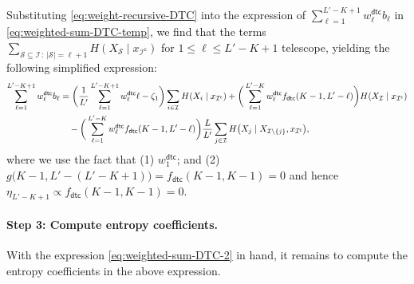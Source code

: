 \documentclass[english]{article}
\newcommand{\cS}{\mathcal{S}}
\newcommand{\cI}{\mathcal{I}}
\newcommand{\dtc}{\mathsf{dtc}}
\begin{document}
Substituting \eqref{eq:weight-recursive-DTC} into the expression of $ \sum_{\ell = 1}^{L'-K+1} w^\dtc_{\ell} b_{\ell} $ in \eqref{eq:weighted-sum-DTC-temp}, we find that the terms $ \sum_{\cS \subseteq \cI \,:\, |\cS|=\ell+1} H(X_{\cS} \mid x_{\cI^\mathsf{c}}) $ for $1\leq \ell \leq L'-K+ 1$ telescope, yielding the following simplified expression:
\begin{align}
\sum_{\ell = 1}^{L'-K+1} w^\dtc_{\ell} b_{\ell}
& = \bigg(\frac{1}{L'} \sum_{\ell = 1}^{L'-K+1}  w^\dtc_{\ell} \ell -  \zeta_{1}\bigg) \sum_{i \in \cI} H(X_i \mid x_{\cI^\mathsf{c}}) + \bigg(\sum_{\ell = 1}^{L'-K} w^\dtc_{\ell} f_\dtc(K-1, L'-\ell) \bigg) H(X_{\cI} \mid x_{\cI^\mathsf{c}}) \notag \\
& \quad  - \bigg(\sum_{\ell = 1}^{L'-K} w^\dtc_{\ell} f_\dtc(K-1, L'-\ell) \bigg) \frac{L}{L'} \sum_{j \in \cI} H\big(X_j \mid X_{\cI \setminus \{j\}}, x_{\cI^\mathsf{c}}\big) , \label{eq:weighted-sum-DTC-2}
\end{align}
where we use the fact that (1) $w^\dtc_{1}$; and (2) $g\big(K-1, L'-(L'-K+1) \big) = f_\dtc(K-1, K-1) = 0$ and hence $\eta_{L'-K+1} \propto f_\dtc(K-1, K-1) = 0$.


\paragraph{Step 3: Compute entropy coefficients.}

With the expression \eqref{eq:weighted-sum-DTC-2} in hand, it remains to compute the entropy coefficients in the above expression.
\end{document}
